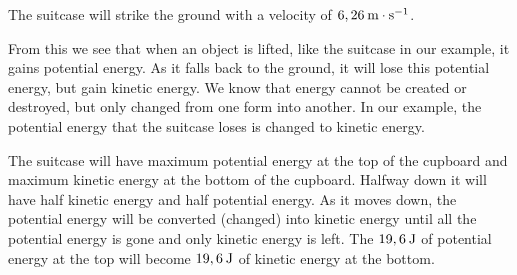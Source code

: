 The suitcase will strike the ground with a velocity of $6,26\phantom{\rule{2pt}{0ex}}\text{m}\ensuremath{\cdot}\text{s}{}^{-1}$.\par 
From this we see that when an object is lifted, like the suitcase in our example, it gains potential energy. As it falls back to the ground, it will lose this potential energy, but gain kinetic energy. We know that energy cannot be created or destroyed, but only changed from one form into another. In our example, the potential energy that the suitcase loses is changed to kinetic energy.\par 
The suitcase will have maximum potential energy at the top of the cupboard and maximum kinetic energy at the bottom of the cupboard. Halfway down it will have half kinetic energy and half potential energy. As it moves down, the potential energy will be converted (changed) into kinetic energy until all the potential energy is gone and only kinetic energy is left. The $19,6\phantom{\rule{2pt}{0ex}}\text{J}$ of potential energy at the top will become $19,6\phantom{\rule{2pt}{0ex}}\text{J}$ of kinetic energy at the bottom.\par 

